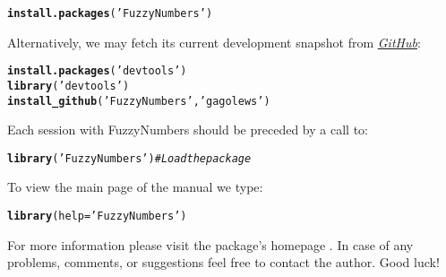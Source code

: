 \documentclass[11pt]{article}\usepackage[]{graphicx}\usepackage[]{color}
\makeatletter
\newcommand{\hlstr}[1]{\textcolor[rgb]{0.192,0.494,0.8}{#1}}%
\newcommand{\hlcom}[1]{\textcolor[rgb]{0.678,0.584,0.686}{\textit{#1}}}%
\newcommand{\hlstd}[1]{\textcolor[rgb]{0.345,0.345,0.345}{#1}}%
\newcommand{\hlkwc}[1]{\textcolor[rgb]{0.333,0.667,0.333}{#1}}%
\newcommand{\hlkwd}[1]{\textcolor[rgb]{0.737,0.353,0.396}{\textbf{#1}}}%
\newenvironment{kframe}{%
 \def\at@end@of@kframe{}%
 \ifinner\ifhmode%
  \def\at@end@of@kframe{\end{minipage}}%
  \begin{minipage}{\columnwidth}%
 \fi\fi%
 \def\FrameCommand##1{\hskip\@totalleftmargin \hskip-\fboxsep
 \colorbox{shadecolor}{##1}\hskip-\fboxsep
     \hskip-\linewidth \hskip-\@totalleftmargin \hskip\columnwidth}%
 \MakeFramed {\advance\hsize-\width
   \@totalleftmargin\z@ \linewidth\hsize
   \@setminipage}}%
 {\par\unskip\endMakeFramed%
 \at@end@of@kframe}
\newenvironment{knitrout}{}{} %
\newcommand{\package}[1]{\textsf{#1}\xspace}
\makeatother
\begin{document}
\begin{knitrout}\small
{}\color{fgcolor}\begin{kframe}
\begin{alltt}
\hlkwd{install.packages}\hlstd{(}\hlstr{'FuzzyNumbers'}\hlstd{)}
\end{alltt}
\end{kframe}
\end{knitrout}

\noindent
Alternatively, we may fetch its current development snapshot
from \href{https://github.com/gagolews/FuzzyNumbers}{\textit{GitHub}}:

\begin{knitrout}\small
{}\color{fgcolor}\begin{kframe}
\begin{alltt}
\hlkwd{install.packages}\hlstd{(}\hlstr{'devtools'}\hlstd{)}
\hlkwd{library}\hlstd{(}\hlstr{'devtools'}\hlstd{)}
\hlkwd{install_github}\hlstd{(}\hlstr{'FuzzyNumbers'}\hlstd{,} \hlstr{'gagolews'}\hlstd{)}
\end{alltt}
\end{kframe}
\end{knitrout}


\bigskip
Each session with \package{FuzzyNumbers} should be preceded by
a call to:

\begin{knitrout}\small
{}\color{fgcolor}\begin{kframe}
\begin{alltt}
\hlkwd{library}\hlstd{(}\hlstr{'FuzzyNumbers'}\hlstd{)} \hlcom{# Load the package}
\end{alltt}
\end{kframe}
\end{knitrout}

\bigskip
To view the main page of the manual we type:

\begin{knitrout}\small
{}\color{fgcolor}\begin{kframe}
\begin{alltt}
\hlkwd{library}\hlstd{(}\hlkwc{help}\hlstd{=}\hlstr{'FuzzyNumbers'}\hlstd{)}
\end{alltt}
\end{kframe}
\end{knitrout}

\noindent
For more information please visit the package's homepage
\cite{Gagolewski:fuzzynumberspackage}. In case of any problems, comments,
or suggestions feel free to contact the author. Good luck!
\end{document}

